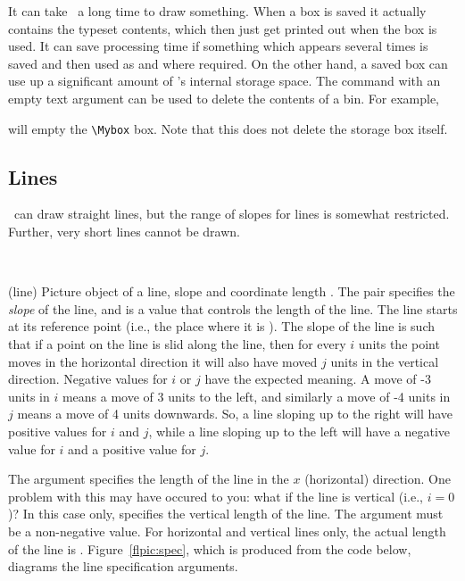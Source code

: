     It can take \ltx\ a long time to draw something. When a box is saved
it actually contains the typeset contents, which then just get 
printed out when the box is
used. It can save processing time if something which appears several times
is saved and then used as and where required. On the other hand, a saved
box can use up a significant amount of \ltx's internal storage space.
The \cmd{\sbox} command with an empty text argument can be used to delete
the contents of a bin. For example, 
\begin{lcode}
\sbox{\Mybox}{}
\end{lcode}
will empty the \verb?\Mybox? box. Note that this does not delete the 
storage box itself.

\subsection{Lines}

    \ltx\ can draw straight 
lines, 
but the range of slopes for lines is
somewhat restricted. Further, very short lines cannot 
be drawn.
\begin{syntax}
\cmd{\line} \\
\end{syntax}
\glossary(line)
{}{Picture object of a line, slope
   and coordinate length .}
The pair  specifies the 
\emph{slope} of the line, and  
is a value that controls the length of the line. The line
starts at its reference point 
(i.e., the place where it is \cmd{\put}).
The slope of the line is such that if a point on the line is slid along the
line, then for every $i$ units the point moves in the horizontal direction
it will also have moved $j$ units in the vertical direction. Negative
values for $i$ or $j$ have the expected meaning. A move of -3 units in $i$
means a move of 3 units to the left, and similarly a move of -4 units in
$j$ means a move of 4 units downwards. So, a line sloping up to the right
will have positive values for $i$ and $j$, while a line sloping up to the
left will have a negative value for $i$ and a positive value for $j$.

    The  argument specifies the length of the line in the
$x$ (horizontal) direction. One problem with this may have occured to you:
what if the line is vertical (i.e., $i=0$)? In this case only, 
specifies the vertical length of the line. The  argument must
be a non-negative value. For horizontal and vertical lines only, the actual
length of the line is . Figure~\ref{flpic:spec}, which is
produced from the code below, diagrams the line 
specification arguments.

